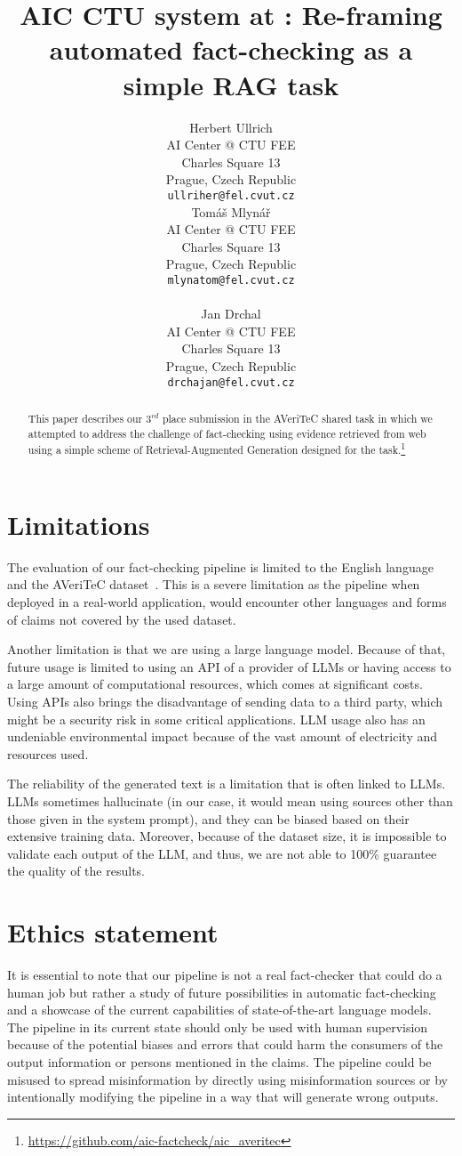 \documentclass[11pt]{article}
\title{AIC CTU system at \averitec{}: Re-framing automated fact-checking as a simple RAG task}
\author{Herbert Ullrich \\
AI Center @ CTU FEE\\
Charles Square 13\\
Prague, Czech Republic\\
\texttt{ullriher@fel.cvut.cz} \\\And
Tomáš Mlynář \\
AI Center @ CTU FEE\\
Charles Square 13\\
Prague, Czech Republic\\
\texttt{mlynatom@fel.cvut.cz} \\ \\\And
Jan Drchal \\
AI Center @ CTU FEE\\
Charles Square 13\\
Prague, Czech Republic\\
\texttt{drchajan@fel.cvut.cz} \\}
\newcommand{\averitec}{AVeriTeC}
\begin{document}
{\makeatletter\acl@finalcopytrue
  \maketitle
}
\begin{abstract}
This paper describes our $3^{rd}$ place submission in the \averitec{} shared task in which we attempted to address the challenge of fact-checking using evidence retrieved from web using a simple scheme of Retrieval-Augmented Generation designed for the task.\footnote{\url{https://github.com/aic-factcheck/aic_averitec}}
\end{abstract}





%


\section*{Limitations}
The evaluation of our fact-checking pipeline is limited to the English language and the \averitec{} dataset~\cite{averitec2024}. This is a severe limitation as the pipeline when deployed in a real-world application, would encounter other languages and forms of claims not covered by the used dataset.

Another limitation is that we are using a large language model. Because of that, future usage is limited to using an API of a provider of LLMs or having access to a large amount of computational resources, which comes at significant costs. Using APIs also brings the disadvantage of sending data to a third party, which might be a security risk in some critical applications. LLM usage also has an undeniable environmental impact because of the vast amount of electricity and resources used.

The reliability of the generated text is a limitation that is often linked to LLMs. LLMs sometimes hallucinate (in our case, it would mean using sources other than those given in the system prompt), and they can be biased based on their extensive training data. Moreover, because of the dataset size, it is impossible to validate each output of the LLM, and thus, we are not able to 100\% guarantee the quality of the results.

\section*{Ethics statement}
It is essential to note that our pipeline is not a real fact-checker that could do a human job but rather a study of future possibilities in automatic fact-checking and a showcase of the current capabilities of state-of-the-art language models. The pipeline in its current state should only be used with human supervision because of the potential biases and errors that could harm the consumers of the output information or persons mentioned in the claims. The pipeline could be misused to spread misinformation by directly using misinformation sources or by intentionally modifying the pipeline in a way that will generate wrong outputs.
\end{document}
